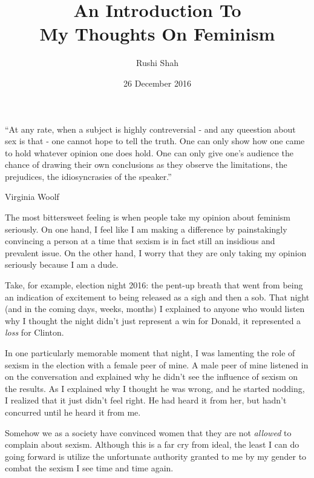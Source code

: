 \documentclass{article}
\author{Rushi Shah}
\date{26 December 2016}
\title{An Introduction To \\ My Thoughts On Feminism}
\begin{document}
\maketitle

	\epigraph{``At any rate, when a subject is highly contreversial - and any queestion about sex is that - one cannot hope to tell the truth. One can only show how one came to hold whatever opinion one does hold. One can only give one's audience the chance of drawing their own conclusions as they observe the limitations, the prejudices, the idiosyncrasies of the speaker.''}{Virginia Woolf}

	The most bittersweet feeling is when people take my opinion about feminism seriously. On one hand, I feel like I am making a difference by painstakingly convincing a person at a time that sexism is in fact still an insidious and prevalent issue. On the other hand, I worry that they are only taking my opinion seriously because I am a dude. 

	Take, for example, election night 2016: the pent-up breath that went from being an indication of excitement to being released as a sigh and then a sob. That night (and in the coming days, weeks, months) I explained to anyone who would listen why I thought the night didn't just represent a win for Donald, it represented a \textit{loss} for Clinton. 


	In one particularly memorable moment that night, I was lamenting the role of sexism in the election with a female peer of mine. A male peer of mine listened in on the conversation and explained why he didn't see the influence of sexism on the results. As I explained why I thought he was wrong, and he started nodding, I realized that it just didn't feel right. He had heard it from her, but hadn't concurred until he heard it from me. 

	Somehow we as a society have convinced women that they are not \textit{allowed} to complain about sexism. Although this is a far cry from ideal, the least I can do going forward is utilize the unfortunate authority granted to me by my gender to combat the sexism I see time and time again. 


\end{document}
